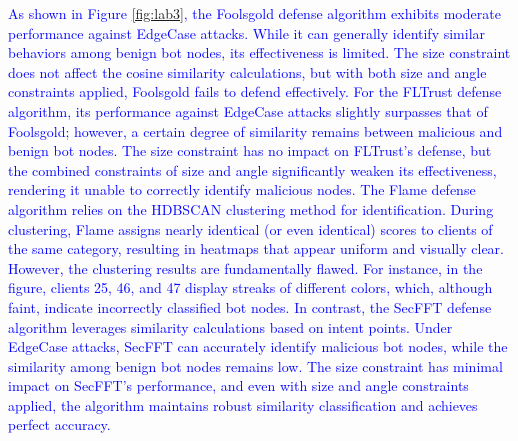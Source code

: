\documentclass[a4paper,twoside,11pt,dvipsnames]{reviewresponse}
\begin{document}
\textcolor{blue}{As shown in Figure \ref{fig:lab3}, the Foolsgold defense algorithm exhibits moderate performance against EdgeCase attacks. While it can generally identify similar behaviors among benign bot nodes, its effectiveness is limited. The size constraint does not affect the cosine similarity calculations, but with both size and angle constraints applied, Foolsgold fails to defend effectively. For the FLTrust defense algorithm, its performance against EdgeCase attacks slightly surpasses that of Foolsgold; however, a certain degree of similarity remains between malicious and benign bot nodes. The size constraint has no impact on FLTrust's defense, but the combined constraints of size and angle significantly weaken its effectiveness, rendering it unable to correctly identify malicious nodes. The Flame defense algorithm relies on the HDBSCAN clustering method for identification. During clustering, Flame assigns nearly identical (or even identical) scores to clients of the same category, resulting in heatmaps that appear uniform and visually clear. However, the clustering results are fundamentally flawed. For instance, in the figure, clients 25, 46, and 47 display streaks of different colors, which, although faint, indicate incorrectly classified bot nodes. In contrast, the SecFFT defense algorithm leverages similarity calculations based on intent points. Under EdgeCase attacks, SecFFT can accurately identify malicious bot nodes, while the similarity among benign bot nodes remains low. The size constraint has minimal impact on SecFFT's performance, and even with size and angle constraints applied, the algorithm maintains robust similarity classification and achieves perfect accuracy.}
\end{document}
